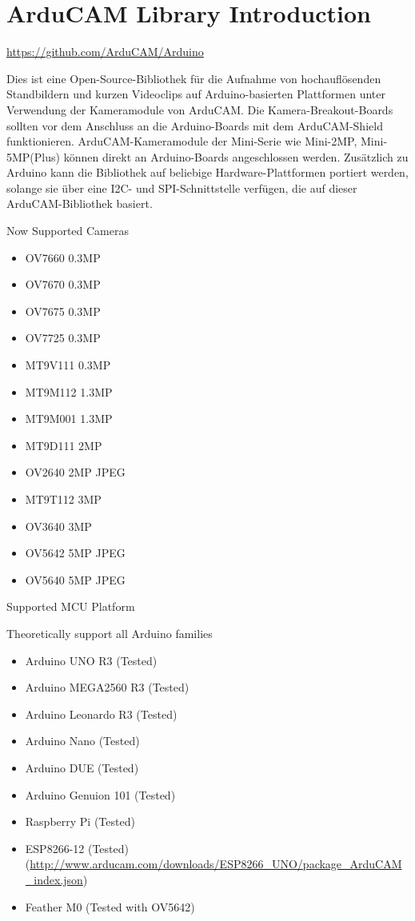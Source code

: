 \section{ArduCAM Library Introduction}

\url{https://github.com/ArduCAM/Arduino}


Dies ist eine Open-Source-Bibliothek für die Aufnahme von hochauflösenden Standbildern und kurzen Videoclips auf Arduino-basierten Plattformen unter Verwendung der Kameramodule von ArduCAM.
Die Kamera-Breakout-Boards sollten vor dem Anschluss an die Arduino-Boards mit dem ArduCAM-Shield funktionieren.
ArduCAM-Kameramodule der Mini-Serie wie Mini-2MP, Mini-5MP(Plus) können direkt an Arduino-Boards angeschlossen werden.
Zusätzlich zu Arduino kann die Bibliothek auf beliebige Hardware-Plattformen portiert werden, solange sie über eine I2C- und SPI-Schnittstelle verfügen, die auf dieser ArduCAM-Bibliothek basiert.

\bigskip

Now Supported Cameras

\begin{itemize}
  \item OV7660 0.3MP
  \item OV7670 0.3MP
  \item OV7675 0.3MP
  \item OV7725 0.3MP
  \item MT9V111 0.3MP
  \item MT9M112 1.3MP
  \item MT9M001 1.3MP
  \item MT9D111 2MP
  \item OV2640 2MP JPEG
  \item MT9T112 3MP
  \item OV3640 3MP
  \item OV5642 5MP JPEG
  \item OV5640 5MP JPEG
\end{itemize}

Supported MCU Platform

Theoretically support all Arduino families

\begin{itemize}
  \item Arduino UNO R3 (Tested)
  \item Arduino MEGA2560 R3 (Tested)
  \item Arduino Leonardo R3 (Tested)
  \item Arduino Nano (Tested)
  \item Arduino DUE (Tested)
  \item Arduino Genuion 101 (Tested)
  \item Raspberry Pi (Tested)
  \item ESP8266-12 (Tested) (\url{http://www.arducam.com/downloads/ESP8266_UNO/package_ArduCAM_index.json})
  \item Feather M0 (Tested with OV5642)
\end{itemize}


